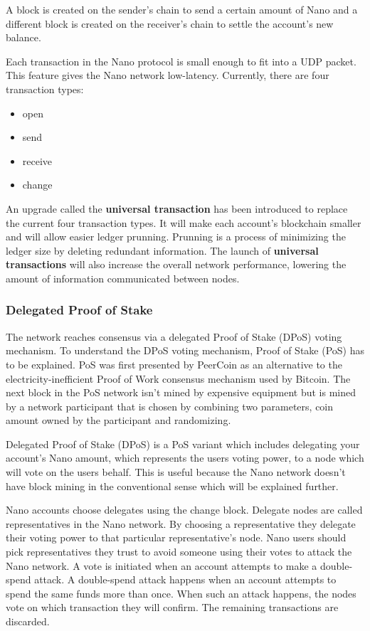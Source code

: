 \documentclass{ferseminar}
\begin{document}
A block is created on the sender's chain to send a certain amount of Nano and a different block is created on the receiver's chain to settle the account's new balance.

Each transaction in the Nano protocol is small enough to fit into a UDP packet. This feature gives the Nano network low-latency. Currently, there are four transaction types: 
\begin{itemize}
	\item open
	\item send
	\item receive
	\item change
\end{itemize}

An upgrade called the \textbf{universal transaction} has been introduced to replace the current four transaction types. It will make each account's blockchain smaller and will allow easier ledger prunning. Prunning is a process of minimizing the ledger size by deleting redundant information. The launch of \textbf{universal transactions} will also increase the overall network performance, lowering the amount of information communicated between nodes.


\subsubsection{Delegated Proof of Stake}

The network reaches consensus via a delegated Proof of Stake (DPoS) voting mechanism. To understand the DPoS voting mechanism, Proof of Stake (PoS) has to be explained. PoS was first presented by PeerCoin \cite{Peercoin} as an alternative to the electricity-inefficient Proof of Work consensus mechanism used by Bitcoin. The next block in the PoS network isn't mined by expensive equipment but is mined by a network participant that is chosen by combining two parameters, coin amount owned by the participant and randomizing.

Delegated Proof of Stake (DPoS) is a PoS variant which includes delegating your account's Nano amount, which represents the users voting power, to a node which will vote on the users behalf. This is useful because the Nano network doesn't have block mining in the conventional sense which will be explained further. 

Nano accounts choose delegates using the change block. Delegate nodes are called representatives in the Nano network. By choosing a representative they delegate their voting power to that particular representative's node. Nano users should pick representatives they trust to avoid someone using their votes to attack the Nano network. A vote is initiated when an account attempts to make a double-spend attack. A double-spend attack happens when an account attempts to spend the same funds more than once. When such an attack happens, the nodes vote on which transaction they will confirm. The remaining transactions are discarded.
\end{document}
